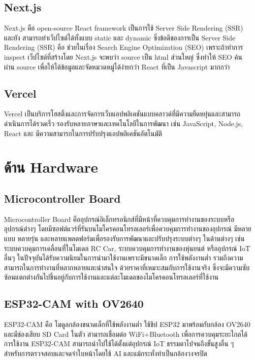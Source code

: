 \subsection{Next.js}
Next.js คือ open-source React framework เป็นการใช้ Server Side Rendering (SSR) และยัง
\enskip \enskip \enspace
สามารถทำเว็ปไซต์ได้ทั้งแบบ static และ dynamic
ซึ่งข้อดีของการเป็น Server Side Rendering (SSR) คือ ช่วยในเรื่อง Search Engine Optimization (SEO) เพราะถ้าทำการ inspect เว็ปไซต์ที่สร้างโดย Next.js จะพบว่า source เป็น html ส่วนใหญ่ ซึ่งทำให้ SEO ค้นผ่าน source เพื่อให้ได้ข้อมูลและจัดหมวดหมู่ได้ง่ายกว่า React ที่เป็น Javascript มากกว่า
\cite{Next}
\subsection{Vercel}
Vercel เป็นบริการโฮสติ้งและการจัดการเว็บแอปพลิเคชันแบบคลาวด์ที่มีความยืดหยุ่นและสามารถดำเนินการได้รวดเร็ว รองรับหลายภาษาและเทคโนโลยีในการพัฒนา เช่น JavaScript, Node.js, React และ มีความสามารถในการปรับปรุงแอปพลิเคชันอัตโนมัติ
\cite{Vercel}
\section{ด้าน Hardware}

\subsection{Microcontroller Board}
Microcontroller Board คืออุปกรณ์อิเล็กทรอนิกส์ที่มีหน้าที่ควบคุมการทำงานของระบบหรืออุปกรณ์ต่างๆ โดยมีซอฟต์แวร์ที่รันบนไมโครคอนโทรลเลอร์เพื่อควบคุมการทำงานของอุปกรณ์ มีหลายแบบ หลายรุ่น และหลายแพลตฟอร์มเพื่อรองรับการพัฒนาและปรับปรุงระบบต่างๆ ในด้านต่างๆ เช่น ระบบควบคุมการเคลื่อนที่ในโมเดล RC Car, 
ระบบควบคุมการทำงานของหุ่นยนต์ หรืออุปกรณ์ IoT อื่นๆ ในปัจจุบันได้รับความนิยมในการนำมาใช้งานเพราะมีขนาดเล็ก การใช้พลังงานต่ำ รวมถึงความสามารถในการทำงานที่หลากหลายและน่าสนใจ ด้วยราคาที่เหมาะสมกับการใช้งานจริง ซึ่งจะมีความซับซ้อนแตกต่างกันไปขึ้นอยู่กับการใช้งานและแต่ละโมเดลของไมโครคอนโทรลเลอร์ที่ใช้งาน\cite{Micro}

\subsection{ESP32-CAM with OV2640}
ESP32-CAM คือ โมดูลกล้องขนาดเล็กที่ใช้พลังงานต่ำ ใช้ชิป ESP32 มาพร้อมกับกล้อง OV2640 และมีช่องเสียบ SD Card ในตัว สามารถเชื่อมต่อ WiFi+Bluetooth เพื่อการควบคุมระยะไกลได้ 
การใช้งาน ESP32-CAM สามารถนำไปใช้ได้ตั้งแต่อุปกรณ์ IoT ธรรมดาไปจนถึงขั้นสูงอื่น ๆ สำหรับการตรวจสอบและจดจำใบหน้าโดยใช้ AI และแม้กระทั่งทำเป็นกล้องวงจรปิด


